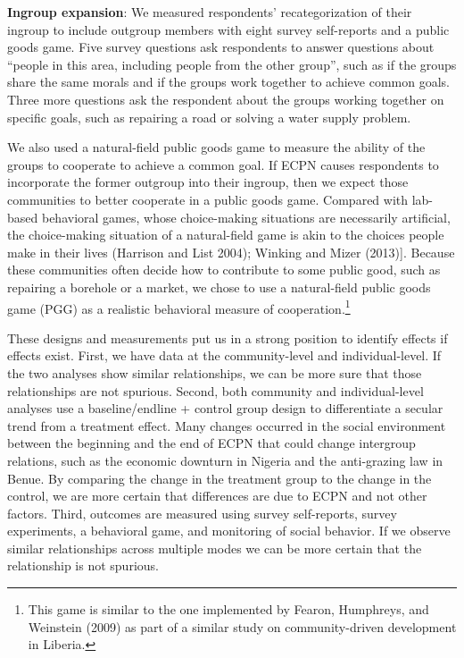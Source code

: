 \documentclass[11pt]{article}
\begin{document}
\textbf{Ingroup expansion}: We measured respondents' recategorization of
their ingroup to include outgroup members with eight survey self-reports
and a public goods game. Five survey questions ask respondents to answer
questions about ``people in this area, including people from the other
group'', such as if the groups share the same morals and if the groups
work together to achieve common goals. Three more questions ask the
respondent about the groups working together on specific goals, such as
repairing a road or solving a water supply problem.

We also used a natural-field public goods game to measure the ability of
the groups to cooperate to achieve a common goal. If ECPN causes
respondents to incorporate the former outgroup into their ingroup, then
we expect those communities to better cooperate in a public goods game.
Compared with lab-based behavioral games, whose choice-making situations
are necessarily artificial, the choice-making situation of a
natural-field game is akin to the choices people make in their lives
(Harrison and List 2004); Winking and Mizer (2013){]}. Because these
communities often decide how to contribute to some public good, such as
repairing a borehole or a market, we chose to use a natural-field public
goods game (PGG) as a realistic behavioral measure of
cooperation.\footnote{This game is similar to the one implemented by
  Fearon, Humphreys, and Weinstein (2009) as part of a similar study on
  community-driven development in Liberia.}

These designs and measurements put us in a strong position to identify
effects if effects exist. First, we have data at the community-level and
individual-level. If the two analyses show similar relationships, we can
be more sure that those relationships are not spurious. Second, both
community and individual-level analyses use a baseline/endline + control
group design to differentiate a secular trend from a treatment effect.
Many changes occurred in the social environment between the beginning
and the end of ECPN that could change intergroup relations, such as the
economic downturn in Nigeria and the anti-grazing law in Benue. By
comparing the change in the treatment group to the change in the
control, we are more certain that differences are due to ECPN and not
other factors. Third, outcomes are measured using survey self-reports,
survey experiments, a behavioral game, and monitoring of social
behavior. If we observe similar relationships across multiple modes we
can be more certain that the relationship is not spurious.
\end{document}
